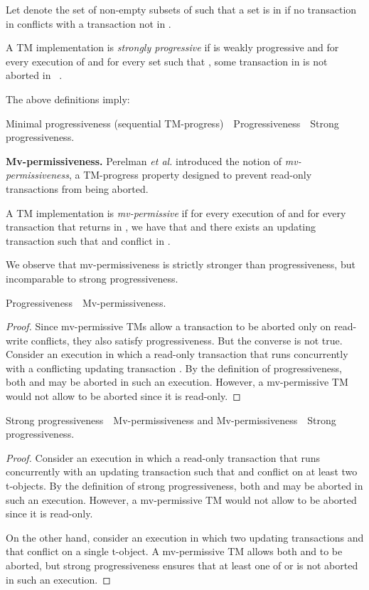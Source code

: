 Let  denote the set of non-empty subsets of  such that a set  is in  
if no transaction in  conflicts with a transaction not in .
\begin{definition}
\label{def:sprog}
A TM implementation  is \emph{strongly progressive} if  is weakly progressive 
and for every execution  of  and for every set  such that , 
some transaction in  is not aborted in ~\cite{tm-book}.
\end{definition}
The above definitions imply:
\begin{corollary}
Minimal progressiveness (sequential TM-progress)~~Progressiveness~~Strong progressiveness.
\end{corollary}
\vspace{1mm}\noindent\textbf{Mv-permissiveness.}
Perelman \emph{et al.} introduced the notion of \emph{mv-permissiveness}, a TM-progress property
designed to prevent read-only transactions from being aborted.
\begin{definition}[Mv-permissiveness]
\label{def:sprog}
A TM implementation  is \emph{mv-permissive} if for every execution  of  and
for every transaction  that returns  in , we have that 
and there exists an updating transaction  such that  and  conflict in .
\end{definition}
We observe that mv-permissiveness is strictly stronger than progressiveness, but incomparable to strong progressiveness.
\begin{observation}
Progressiveness~~Mv-permissiveness.
\end{observation}
\begin{proof}
Since mv-permissive TMs allow a transaction to be aborted only on read-write conflicts, they also
satisfy progressiveness. But the converse is not true.
Consider an execution in which a read-only transaction  that runs concurrently with a conflicting
updating transaction .
By the definition of progressiveness, both  and  may be aborted in such an execution.
However, a mv-permissive TM would not allow  to be aborted since it is read-only.
\end{proof}
\begin{observation}
Strong progressiveness~~Mv-permissiveness and Mv-permissiveness~~Strong progressiveness.
\end{observation}
\begin{proof}
Consider an execution in which a read-only transaction  that runs concurrently with an
updating transaction  such that  and  conflict on at least two t-objects.
By the definition of strong progressiveness, both  and  may be aborted in such an execution.
However, a mv-permissive TM would not allow  to be aborted since it is read-only.

On the other hand, consider an execution in which two updating transactions  and  that conflict on a single t-object.
A mv-permissive TM allows both  and  to be aborted, but strong progressiveness ensures that at least one of
 or  is not aborted in such an execution.
\end{proof}
